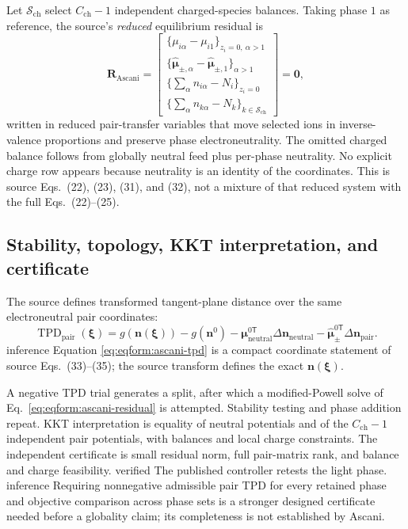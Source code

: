 \documentclass[11pt]{article}
\newcommand{\Evidence}[1]{\textsf{#1}}
\newcommand{\TPD}{\operatorname{TPD}}
\begin{document}
Let \(\mathcal S_{\mathrm{ch}}\) select \(C_{\mathrm{ch}}-1\) independent
charged-species balances. Taking phase \(1\) as reference, the source's
\emph{reduced} equilibrium residual is
\begin{equation}
 \boldsymbol R_{\mathrm{Ascani}}=
 \begin{bmatrix}
 \{\mu_{i\alpha}-\mu_{i1}\}_{z_i=0,\ \alpha>1}\\
 \{\widehat{\boldsymbol\mu}_{\pm,\alpha}
 -\widehat{\boldsymbol\mu}_{\pm,1}\}_{\alpha>1}\\
 \{\sum_\alpha n_{i\alpha}-N_i\}_{z_i=0}\\
 \{\sum_\alpha n_{k\alpha}-N_k\}_{k\in\mathcal S_{\mathrm{ch}}}
 \end{bmatrix}
 =\boldsymbol0,
\label{eq:eqform:ascani-residual}
\end{equation}
written in reduced pair-transfer variables that move selected ions in
inverse-valence proportions and preserve phase electroneutrality. The omitted
charged balance follows from globally neutral feed plus per-phase neutrality.
No explicit charge row appears because neutrality is an identity of the
coordinates. This is source Eqs.~(22), (23), (31), and (32), not a mixture of
that reduced system with the full Eqs.~(22)--(25).

\subsection{Stability, topology, KKT interpretation, and certificate}

The source defines transformed tangent-plane distance over the same
electroneutral pair coordinates:
\begin{equation}
 \TPD_{\mathrm{pair}}(\boldsymbol\xi)
 =g(\boldsymbol n(\boldsymbol\xi))
 -g(\boldsymbol n^0)
 -\boldsymbol\mu_{\mathrm{neutral}}^{0\mathsf T}
 \Delta\boldsymbol n_{\mathrm{neutral}}
 -\widehat{\boldsymbol\mu}_{\pm}^{0\mathsf T}
 \Delta\boldsymbol n_{\mathrm{pair}}.
\label{eq:eqform:ascani-tpd}
\end{equation}
\Evidence{inference} Equation \eqref{eq:eqform:ascani-tpd} is a compact
coordinate statement of source Eqs.~(33)--(35); the source transform defines
the exact \(\boldsymbol n(\boldsymbol\xi)\).

A negative TPD trial generates a split, after which a modified-Powell solve of
Eq.~\eqref{eq:eqform:ascani-residual} is attempted. Stability testing and phase
addition repeat. KKT interpretation is equality of neutral potentials and of
the \(C_{\mathrm{ch}}-1\) independent pair potentials, with balances and local
charge constraints. The independent certificate is small residual norm, full
pair-matrix rank, and balance and charge feasibility. \Evidence{verified} The
published controller retests the light phase. \Evidence{inference} Requiring
nonnegative admissible pair TPD for every retained phase and objective
comparison across phase sets is a stronger designed certificate needed before
a globality claim; its completeness is not established by Ascani.
\end{document}

